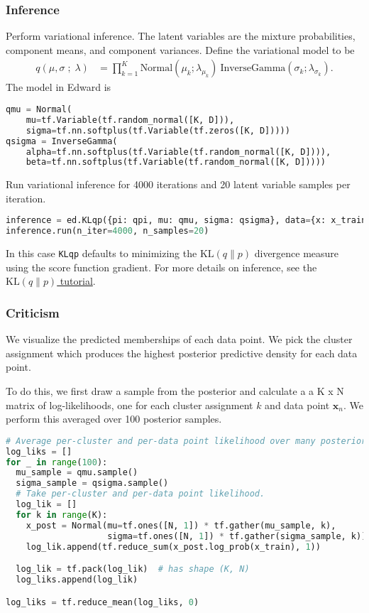 \subsubsection{Inference}
Perform variational inference.
%
The latent variables are the mixture probabilities,
component means, and component variances.
Define the variational model to be
\begin{align*}
 q(\mu, \sigma \;;\; \lambda)
 &=
 \prod_{k=1}^K
 \text{Normal}(\mu_k; \lambda_{\mu_k})
 ~
 \text{InverseGamma}(\sigma_k; \lambda_{\sigma_k}).
\end{align*}
The model in Edward is
\begin{lstlisting}[language=Python]
qmu = Normal(
    mu=tf.Variable(tf.random_normal([K, D])),
    sigma=tf.nn.softplus(tf.Variable(tf.zeros([K, D]))))
qsigma = InverseGamma(
    alpha=tf.nn.softplus(tf.Variable(tf.random_normal([K, D]))),
    beta=tf.nn.softplus(tf.Variable(tf.random_normal([K, D]))))
\end{lstlisting}

Run variational inference for 4000 iterations and 20 latent variable
samples per iteration.
\begin{lstlisting}[language=Python]
inference = ed.KLqp({pi: qpi, mu: qmu, sigma: qsigma}, data={x: x_train})
inference.run(n_iter=4000, n_samples=20)
\end{lstlisting}
In this case
\texttt{KLqp} defaults to minimizing the
$\text{KL}(q\|p)$ divergence measure using the score function
gradient.
For more details on inference, see the \href{/tutorials/klqp}{$\text{KL}(q\|p)$ tutorial}.


\subsubsection{Criticism}

We visualize the predicted memberships of each data point.
We pick the cluster assignment which produces
the highest posterior predictive density for each data point.

To do this, we first draw a sample from the posterior and calculate a
a K x N matrix of log-likelihoods, one for each cluster assignment $k$
and data point $\mathbf{x}_n$. We perform this averaged over 100
posterior samples.
\begin{lstlisting}[language=Python]
# Average per-cluster and per-data point likelihood over many posterior samples.
log_liks = []
for _ in range(100):
  mu_sample = qmu.sample()
  sigma_sample = qsigma.sample()
  # Take per-cluster and per-data point likelihood.
  log_lik = []
  for k in range(K):
    x_post = Normal(mu=tf.ones([N, 1]) * tf.gather(mu_sample, k),
                    sigma=tf.ones([N, 1]) * tf.gather(sigma_sample, k))
    log_lik.append(tf.reduce_sum(x_post.log_prob(x_train), 1))

  log_lik = tf.pack(log_lik)  # has shape (K, N)
  log_liks.append(log_lik)

log_liks = tf.reduce_mean(log_liks, 0)
\end{lstlisting}

